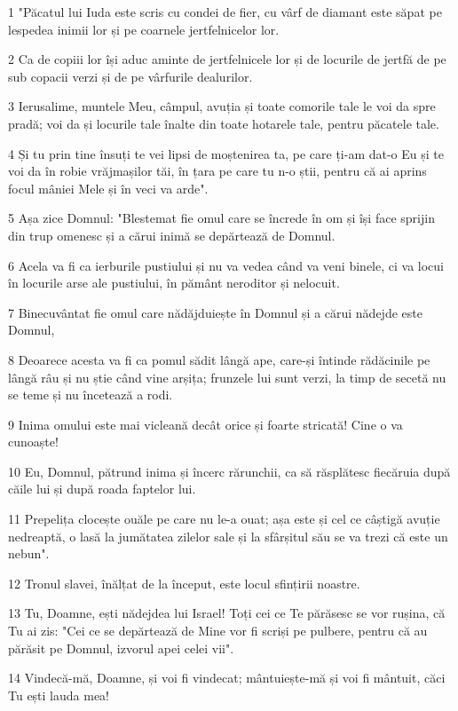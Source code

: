 \par 1 "Păcatul lui Iuda este scris cu condei de fier, cu vârf de diamant este săpat pe lespedea inimii lor și pe coarnele jertfelnicelor lor.
\par 2 Ca de copiii lor își aduc aminte de jertfelnicele lor și de locurile de jertfă de pe sub copacii verzi și de pe vârfurile dealurilor.
\par 3 Ierusalime, muntele Meu, câmpul, avuția și toate comorile tale le voi da spre pradă; voi da și locurile tale înalte din toate hotarele tale, pentru păcatele tale.
\par 4 Și tu prin tine însuți te vei lipsi de moștenirea ta, pe care ți-am dat-o Eu și te voi da în robie vrăjmașilor tăi, în țara pe care tu n-o știi, pentru că ai aprins focul mâniei Mele și în veci va arde".
\par 5 Așa zice Domnul: "Blestemat fie omul care se încrede în om și își face sprijin din trup omenesc și a cărui inimă se depărtează de Domnul.
\par 6 Acela va fi ca ierburile pustiului și nu va vedea când va veni binele, ci va locui în locurile arse ale pustiului, în pământ neroditor și nelocuit.
\par 7 Binecuvântat fie omul care nădăjduiește în Domnul și a cărui nădejde este Domnul,
\par 8 Deoarece acesta va fi ca pomul sădit lângă ape, care-și întinde rădăcinile pe lângă râu și nu știe când vine arșița; frunzele lui sunt verzi, la timp de secetă nu se teme și nu încetează a rodi.
\par 9 Inima omului este mai vicleană decât orice și foarte stricată! Cine o va cunoaște!
\par 10 Eu, Domnul, pătrund inima și încerc rărunchii, ca să răsplătesc fiecăruia după căile lui și după roada faptelor lui.
\par 11 Prepelița clocește ouăle pe care nu le-a ouat; așa este și cel ce câștigă avuție nedreaptă, o lasă la jumătatea zilelor sale și la sfârșitul său se va trezi că este un nebun".
\par 12 Tronul slavei, înălțat de la început, este locul sfințirii noastre.
\par 13 Tu, Doamne, ești nădejdea lui Israel! Toți cei ce Te părăsesc se vor rușina, că Tu ai zis: "Cei ce se depărtează de Mine vor fi scriși pe pulbere, pentru că au părăsit pe Domnul, izvorul apei celei vii".
\par 14 Vindecă-mă, Doamne, și voi fi vindecat; mântuiește-mă și voi fi mântuit, căci Tu ești lauda mea!
